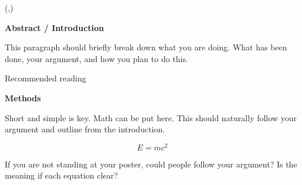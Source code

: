 \documentclass[dark]{cgem-poster}
\begin{document}
\begin{textblock*}{\PosterColumnOneTextWidth{}}(\PosterColumnOneTextLeft{},\PosterColumnOneTextTop{})
  \begin{minipage}[t][\PosterColumnOneTextHeight{}][t]{\PosterColumnOneTextWidth{}}
    \vspace{5mm}
    \begin{center}
      \large
      \textbf{Abstract / Introduction}
    \end{center}

    \vspace{5mm}
    \small
    This paragraph should briefly break down what you are doing. %
    What has been done, your argument, and how you plan to do this.

    \vspace{7mm}
    Recommended reading \cite{Landes1958}

    \vspace{8cm}
    \begin{center}
      \large
      \textbf{Methods}
    \end{center}

    \vspace{5mm}
    \small
    Short and simple is key. Math can be put here. %
    This should naturally follow your argument and outline from the introduction.

    \vspace{-2cm}
    \large
    \begin{equation*}
      \mathit{E = m c^\mathrm{2}}
    \end{equation*}

    \vspace{1cm}
    \small
    If you are not standing at your poster, could people follow your argument? %
    Is the meaning if each equation clear?

  \end{minipage}
\end{textblock*}

\newcommand{\PosterColumnTwoTextLeft}{\dimexpr (\PosterColumnTwoLeft + \PosterTextMarginSize)\relax}
\newcommand{\PosterColumnTwoTextWidth}{\dimexpr (\PosterColumnTwoWidth - 2\PosterTextMarginSize)\relax}
\newcommand{\PosterColumnTwoTextTop}{\dimexpr (\PosterColumnTwoTop + \PosterTextMarginSize)\relax}
\newcommand{\PosterColumnTwoTextHeight}{\dimexpr (\PosterColumnTwoHeight - 2\PosterTextMarginSize)\relax}
\end{document}
